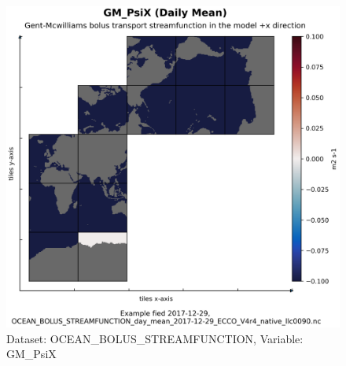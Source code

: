 \begin{figure}[H]
\centering
\includegraphics[scale=0.55]{../images/plots/native_plots/Gent-McWilliams_Bolus_Transport_Streamfunction/GM_PsiX.png}
\caption{Dataset: OCEAN\_BOLUS\_STREAMFUNCTION, Variable: GM\_PsiX}
\label{tab:table-OCEAN_BOLUS_STREAMFUNCTION_GM_PsiX-Plot}
\end{figure}
\pagebreak
